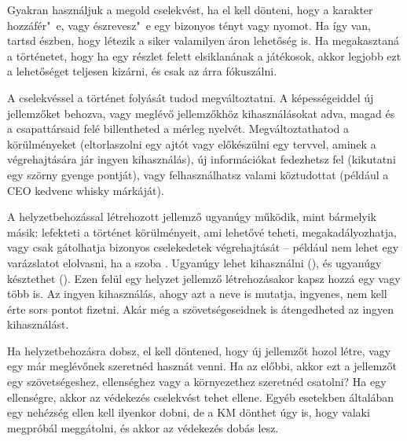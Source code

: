 
Gyakran használjuk a megold cselekvést, ha el kell dönteni, hogy a karakter hozzáfér"~e, vagy észrevesz"~e egy bizonyos tényt vagy nyomot. Ha így van, tartsd észben, hogy létezik a siker valamilyen áron lehetőség is. Ha megakasztaná a történetet, hogy ha egy részlet felett elsiklanának a játékosok, akkor legjobb ezt a lehetőséget teljesen kizárni, és csak az árra fókuszálni.

\newpage

\label{Helyzetbehozás}

A  cselekvéssel a történet folyását tudod megváltoztatni. A képességeiddel új jellemzőket behozva, vagy meglévő jellemzőkhöz kihasználásokat adva, magad és a csapattársaid felé billentheted a mérleg nyelvét. Megváltoztathatod a körülményeket (eltorlaszolni egy ajtót vagy előkészülni egy tervvel, aminek a végrehajtására jár ingyen kihasználás), új információkat fedezhetsz fel (kikutatni egy szörny gyenge pontját), vagy felhasználhatsz valami köztudottat (például a CEO kedvenc whisky márkáját).

A helyzetbehozással létrehozott jellemző ugyanúgy működik, mint bármelyik másik: lefekteti a történet körülményeit, ami lehetővé teheti, megakadályozhatja, vagy csak gátolhatja bizonyos cselekedetek végrehajtását -- például nem lehet egy varázslatot elolvasni, ha a szoba . Ugyanúgy lehet kihasználni (), és ugyanúgy késztethet (). Ezen felül egy helyzet jellemző létrehozásakor kapsz hozzá egy vagy több  is. Az ingyen kihasználás, ahogy azt a neve is mutatja, ingyenes, nem kell érte sors pontot fizetni. Akár még a szövetségeseidnek is átengedheted az ingyen kihasználást.

Ha helyzetbehozásra dobsz, el kell döntened, hogy új jellemzőt hozol létre, vagy egy már meglévőnek szeretnéd hasznát venni. Ha az előbbi, akkor ezt a jellemzőt egy szövetségeshez, ellenséghez vagy a környezethez szeretnéd csatolni? Ha egy ellenségre, akkor az védekezés cselekvést tehet ellene. Egyéb esetekben általában egy nehézség ellen kell ilyenkor dobni, de a KM dönthet úgy is, hogy valaki megpróbál meggátolni, és akkor az védekezés dobás lesz.

